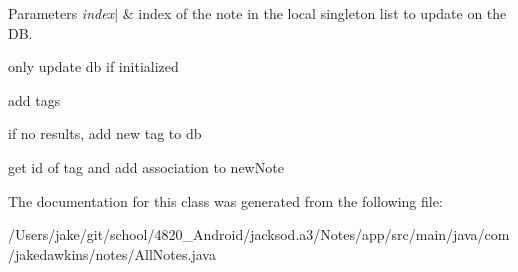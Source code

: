 \begin{DoxyParams}{Parameters}
{\em index$\vert$} & index of the note in the local singleton list to update on the DB. \\
\hline
\end{DoxyParams}
only update db if initialized

add tags

if no results, add new tag to db

get id of tag and add association to new\+Note 

The documentation for this class was generated from the following file\+:\begin{DoxyCompactItemize}
\item 
/\+Users/jake/git/school/4820\+\_\+\+Android/jacksod.\+a3/\+Notes/app/src/main/java/com/jakedawkins/notes/All\+Notes.\+java\end{DoxyCompactItemize}
